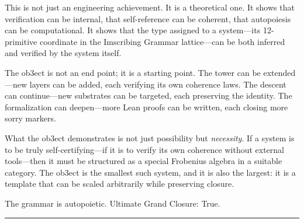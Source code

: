 \documentclass[12pt,a4paper]{article}
\begin{document}
This is not just an engineering achievement. It is a theoretical one. It shows that verification can be internal, that self-reference can be coherent, that autopoiesis can be computational. It shows that the type assigned to a system---its 12-primitive coordinate in the Imscribing Grammar lattice---can be both inferred and verified by the system itself.

The ob3ect is not an end point; it is a starting point. The tower can be extended---new layers can be added, each verifying its own coherence laws. The descent can continue---new substrates can be targeted, each preserving the identity. The formalization can deepen---more Lean proofs can be written, each closing more sorry markers.

What the ob3ect demonstrates is not just possibility but \emph{necessity}. If a system is to be truly self-certifying---if it is to verify its own coherence without external tools---then it must be structured as a special Frobenius algebra in a suitable category. The ob3ect is the smallest such system, and it is also the largest: it is a template that can be scaled arbitrarily while preserving closure.

The grammar is autopoietic. Ultimate Grand Closure: True.

\begin{center}
\rule{0.5\textwidth}{0.4pt}
\end{center}
\end{document}
